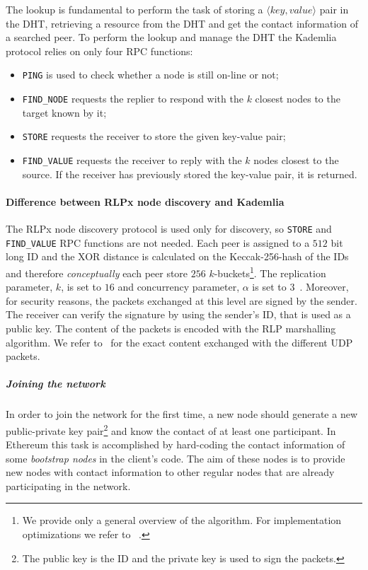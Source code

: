 The lookup is fundamental to perform the task of storing a $\langle key,
value\rangle$ pair in the DHT, retrieving a resource from the DHT and get
the contact information of a searched peer.
To perform the lookup and manage the DHT the Kademlia protocol relies on only 
four RPC functions:
\begin{itemize}
	\item \verb|PING| is used to check whether a node is still on-line
	or not;
	\item \verb|FIND_NODE| requests the replier to respond with the $k$ closest
	nodes to the target known by it;
	\item \verb|STORE| requests the receiver to store the given
	key-value pair;
	\item \verb|FIND_VALUE| requests the receiver to reply with the $k$
	nodes closest to the source. If the receiver has previously stored the
	key-value pair, it is returned.
\end{itemize}


\paragraph{Difference between RLPx node discovery and Kademlia}
\label{sec:rlpx-discovery}
The RLPx node discovery protocol is used only for discovery, so
\verb|STORE| and \verb|FIND_VALUE| RPC functions are not 
needed.
Each peer is assigned to a $512$ bit long ID and the XOR distance is calculated
on the Keccak-256-hash of the IDs and therefore
\emph{conceptually} each peer store $256$ $k$-buckets\footnote{
	We provide only a general overview of the algorithm. For implementation
	optimizations we refer to ~\cite{bib:kademlia}.}.
The replication parameter, $k$, is set to $16$ and concurrency parameter, $\alpha$ is set to $3$~\cite{bib:rlpx-discovery-protocol}.
Moreover, for security reasons, the packets exchanged at this level are signed
by the sender. The receiver can verify the signature by using the sender's ID, 
that is used as a public key.
The content of the packets is encoded with the RLP marshalling algorithm.
We refer to~\cite{bib:rlpx-discovery-protocol} for the exact content exchanged 
with the different UDP packets.





\subparagraph{Joining the network}
In order to join the network for the first time, a new node should generate a
new public-private key pair\footnote{The public key is the ID and the private
key is used to sign the packets.} and know the contact of at least one
participant. In Ethereum this task is accomplished by hard-coding the contact
information of some \textit{bootstrap nodes} in the client's code. The aim of
these nodes is to provide new nodes with contact information to other regular
nodes that are already participating in the network.

